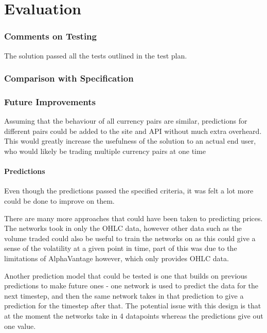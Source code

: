\newpage
\part{Evaluation}  

    \section{Comments on Testing}
    The solution passed all the tests outlined in the test plan.

    \section{Comparison with Specification}

    \section{Future Improvements}
    
    Assuming that the behaviour of all currency pairs are similar, predictions for different pairs could be added to the site and API without much extra overheard. This would greatly increase the usefulness of the solution to an actual end user, who would likely be trading multiple currency pairs at one time

        \subsection{Predictions}
        Even though the predictions passed the specified criteria, it was felt a lot more could be done to improve on them.
        
        There are many more approaches that could have been taken to predicting prices. The networks took in only the OHLC data, however other data such as the volume traded could also be useful to train the networks on as this could give a sense of the volatility at a given point in time, part of this was due to the limitations of AlphaVantage however, which only provides OHLC data.

        Another prediction model that could be tested is one that builds on previous predictions to make future ones - one network is used to predict the data for the next timestep, and then the same network takes in that prediction to give a prediction for the timestep after that. The potential issue with this design is that at the moment the networks take in 4 datapoints whereas the predictions give out one value.

